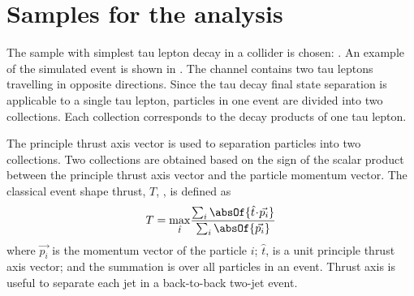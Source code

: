 \section{Samples for the analysis}
\label{sec:tauDecayModes}

The sample with simplest tau lepton decay in a \ee collider is chosen: \eeToTauTau. An example of the simulated \eeToTauTau event is shown in . The \eeToTauTau channel contains two tau leptons travelling in opposite directions. Since the tau decay final state separation is applicable to a single tau lepton, particles in one event are divided into two collections. Each collection corresponds  to the decay products of one tau lepton.

The principle thrust axis vector is used to separation particles into two collections. Two collections are obtained based on the sign of the scalar product between the principle thrust axis vector  and the particle momentum vector. The classical event shape thrust, $T$,  \cite{PhysRevLett.39.1587}, is defined as
\begin{equation}
T = \max_{\hat{t}}\!\frac{\sum_{i}\absOf{\hat{t}\!\cdot\!\vec{p_{i}}}}{\sum_{i}\absOf{\vec{p_{i}}}}
\end{equation}
where $\vec{p_{i}}$ is the momentum vector of the particle $i$;   $\hat{t}$, is a unit principle thrust axis vector; and the summation is over all particles in an event. Thrust axis is useful to separate each jet in a back-to-back two-jet event.


